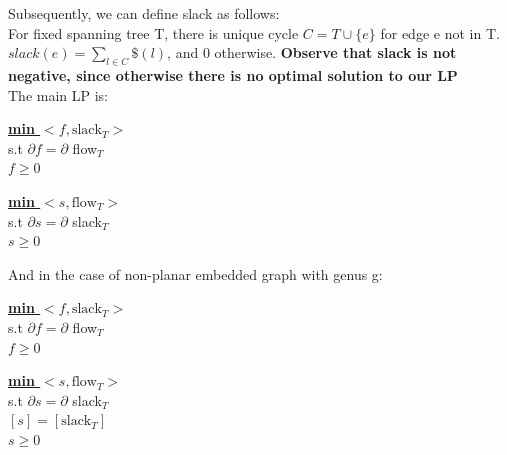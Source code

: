 \documentclass{article}
\begin{document}
Subsequently, we can define slack as follows: \\
For fixed spanning tree T, there is unique cycle $C = T \cup \{e\}$ for edge e 
not in T. $slack(e) = \sum_{l \in C} \$(l)$, and 0 otherwise.
\textbf{Observe that slack is not negative, since otherwise there is no optimal solution to our LP} \\
The main LP is:\\


\begin{minipage}[t]{0.48\linewidth}
\begin{center}
\begin{algorithm}
\textbf{\underline{min $<f, \text{slack}_{T}>$}} \\
  s.t  $\partial f =\partial $  flow$_T$ \\ \qquad
       $f \geq 0$
\end{algorithm}
\end{center}
\end{minipage}
\hfill
\begin{minipage}[t]{0.48\linewidth}
\begin{algorithm}
\textbf{\underline{min $<s, \text{flow}_{T}>$}} \\
  s.t  $\partial s = \partial $ slack$_T$ \\ \qquad
       $s \geq 0$
\end{algorithm}
\end{minipage}

\vspace{0.3 cm}
And in the case of non-planar embedded graph with genus g:
\vspace{0.1 cm}

\begin{minipage}[t]{0.48\linewidth}
\begin{center}
\begin{algorithm}
\textbf{\underline{min $<f, \text{slack}_{T}>$}} \\
  s.t  $\partial f =\partial $  flow$_T$ \\ \qquad
       $f \geq 0$
\end{algorithm}
\end{center}
\end{minipage}
\hfill
\begin{minipage}[t]{0.48\linewidth}
\begin{algorithm}
\textbf{\underline{min $<s, \text{flow}_{T}>$}} \\
  s.t  $\partial s = \partial $ slack$_T$ \\ \qquad
       $[s] = [\text{slack}_T]$ \\ \qquad
       $s \geq 0$
\end{algorithm}
\end{minipage}
\vspace{0.3 cm}
\end{document}
